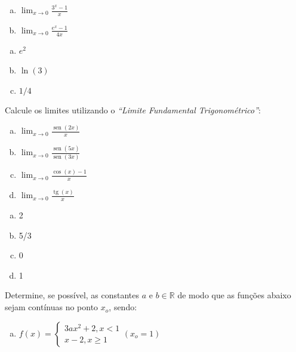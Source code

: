 \documentclass[a4paper, 12pt, addpoints]{exam}
\begin{document}
\begin{questions}
\begin{multicols}{3}
\begin{enumerate}[a)]
\item $\lim _{x \rightarrow 0} \frac{3^{x}-1}{x}$
\item $\lim _{x \rightarrow 0} \frac{e^{x}-1}{4 x}$
\end{enumerate}
\end{multicols}
\begin{resp}
\begin{multicols}{3}
\begin{enumerate}[a)]
\item $e^2$
\item $\ln(3)$
\item $1/4$
\end{enumerate}
\end{multicols}
\end{resp}
\question  Calcule os limites utilizando o \textit{``Limite Fundamental Trigonométrico''}:
\begin{multicols}{4}
\begin{enumerate}[a)]
\item $\lim _{x \rightarrow 0} \frac{\operatorname{sen}(2 x)}{x}$
\item $\lim _{x \rightarrow 0} \frac{\operatorname{sen}(5 x)}{\operatorname{sen}(3 x)}$
\item $\lim _{x \rightarrow 0} \frac{\cos (x)-1}{x}$
\item $\lim _{x \rightarrow 0} \frac{\operatorname{tg}(x)}{x}$
\end{enumerate}
\end{multicols}
\begin{resp}
\begin{multicols}{4}
\begin{enumerate}[a)]
\item 2
\item 5/3
\item 0
\item 1
\end{enumerate}
\end{multicols}
\end{resp}
\question Determine, se possível, as constantes $a$ e $b \in \mathbb{R}$ de modo que as funções abaixo sejam contínuas no ponto $x_{o}$, sendo:
\begin{multicols}{2}
\begin{enumerate}[a)]
\item $f(x)=\left\{\begin{array}{l}3 a x^{2}+2, x<1 \\ x-2, x \geq 1\end{array}\left(x_{o}=1\right)\right.$

\end{enumerate}
\end{multicols}
\end{questions}
\end{document}
